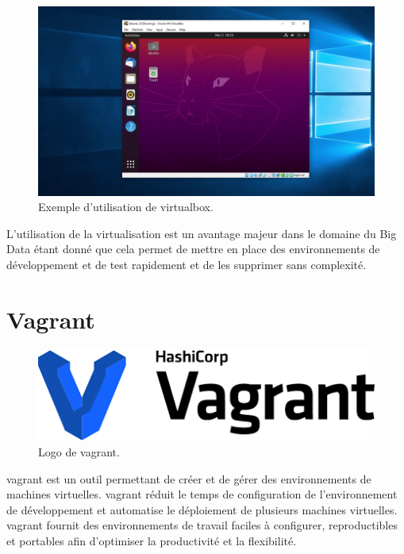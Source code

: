 \documentclass[12pt, french]{report}
\begin{document}
\begin{figure}[h]
\includegraphics[scale=0.2]{assets/img/example-vbox.png}
\centering
\caption{Exemple d'utilisation de \gls{virtualbox}.}
\label{fig:example-vbox}
\end{figure}

L'utilisation de la virtualisation est un avantage majeur dans le domaine du Big Data étant donné que cela permet de mettre en place des environnements de développement et de test rapidement et de les supprimer sans complexité.

\section{Vagrant}

\begin{figure}[h]
\includegraphics[scale=0.5]{assets/img/logo-vagrant.png}
\centering
\caption{Logo de \gls{vagrant}.}
\label{fig:logo-adaltas}
\end{figure}

\gls{vagrant} est un outil permettant de créer et de gérer des environnements de machines virtuelles. \gls{vagrant} réduit le temps de configuration de l'environnement de développement et automatise le déploiement de plusieurs machines virtuelles. \gls{vagrant} fournit des environnements de travail faciles à configurer, reproductibles et portables afin d'optimiser la productivité et la flexibilité.
\end{document}
